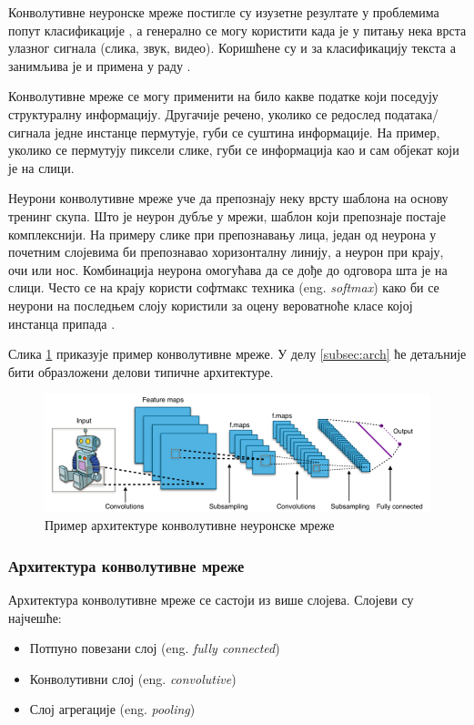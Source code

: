 \documentclass[a4paper]{article}
\begin{document}
Конволутивне неуронске мреже постигле су изузетне резултате у проблемима попут класификације \cite{krizhevsky,
ciregan, DBLP:journals/corr/SimonyanZ14a},
а генерално се могу користити када је у питању нека врста улазног сигнала (слика, звук, видео). Коришћене су и
за класификацију текста \cite{cnnForText} а занимљива је и примена у раду \cite{cnnForAutism}.

Конволутивне мреже се могу применити на било какве податке који поседују структуралну информацију.
Другачије речено, уколико се редослед података/сигнала једне инстанце пермутује, губи се суштина информације.
На пример, уколико се пермутују пиксели слике, губи се информација као и сам објекат који је на слици.

Неурони конволутивне мреже уче да препознају неку врсту шаблона на основу тренинг скупа. Што је неурон дубље у мрежи,
шаблон који препознаје постаје комплекснији. На примеру слике при препознавању лица,
један од неурона у почетним слојевима би препознавао хоризонталну линију, а неурон при крају, очи или нос. Комбинација неурона
омогућава да се дође до одговора шта је на слици. Често се на крају користи софтмакс техника (eng. \textit{softmax}) како би се
неурони на последњем слоју користили за оцену вероватноће класе којој инстанца припада \cite{bishop}.

Слика \ref{fig:cnn} приказује пример конволутивне мреже. У делу \ref{subsec:arch} ће детаљније бити образложени делови типичне архитектуре.

\begin{figure}[h!]
\begin{center}
\includegraphics[width=\textwidth]{resources/typical-cnn.png}
\end{center}
\caption{Пример архитектуре конволутивне неуронске мреже}
\label{fig:cnn}
\end{figure}

\subsubsection{Архитектура конволутивне мреже}
Архитектура конволутивне мреже се састоји из више слојева.
Слојеви су најчешће:
\begin{itemize}
    \item Потпуно повезани слој (eng. \textit{fully connected})
    \item Конволутивни слој (eng. \textit{convolutive})
    \item Слој агрегације (eng. \textit{pooling})
\end{itemize}
\end{document}
